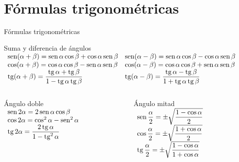 \documentclass[8pt]{beamer}
\title{}
\author{Ricardo Mateos}
\institute[UHEI-IVED]{Departamento de Matemáticas \\ UHEI - IVED}
\date{Matemáticas I}
\newcommand{\sen}{\mathop{\rm sen}\nolimits}
\newcommand{\tg}{\mathop{\rm tg}\nolimits}
\begin{document}
\begin{frame}
\maketitle
\end{frame}

\begin{frame}
\tableofcontents
\end{frame}

\section{Fórmulas trigonométricas}

\begin{frame}{Fórmulas trigonométricas}
\begin{alertblock}{Suma y diferencia de ángulos}
$\begin{array}{ll}
\sen(\alpha+\beta)=\sen\alpha\cos\beta+\cos\alpha\sen\beta & 
\sen(\alpha-\beta)=\sen\alpha\cos\beta-\cos\alpha\sen\beta \\
\cos(\alpha+\beta)=\cos\alpha\cos\beta-\sen\alpha\sen\beta & 
\cos(\alpha-\beta)=\cos\alpha\cos\beta+\sen\alpha\sen\beta \\
\tg(\alpha+\beta)=\dfrac{\tg\alpha+\tg\beta}{1-\tg\alpha\tg\beta} & 
\tg(\alpha-\beta)=\dfrac{\tg\alpha-\tg\beta}{1+\tg\alpha\tg\beta}
\end{array}$
\end{alertblock}

\begin{columns}
\begin{column}{0.45\textwidth}
\begin{alertblock}{Ángulo doble}
$\begin{array}{l}
\sen 2\alpha=2\sen\alpha\cos\beta  \\
\cos 2\alpha=\cos^2\alpha-\sen^2\alpha \\
\tg 2\alpha =\dfrac{2\tg\alpha}{1-\tg^2\alpha} 
\end{array}$
\vspace{2.3em}

\end{alertblock}
\end{column}
\begin{column}{0.45\textwidth}
\begin{alertblock}{Ángulo mitad}
$\begin{array}{l}
\sen \dfrac{\alpha}{2}=\pm \sqrt{\dfrac{1-\cos\alpha}{2}} \\
\cos \dfrac{\alpha}{2}=\pm \sqrt{\dfrac{1+\cos\alpha}{2}} \\
\tg \dfrac{\alpha}{2}=\pm \sqrt{\dfrac{1-\cos\alpha}{1+\cos\alpha}} 
\end{array}$
\end{alertblock}
\end{column}
\end{columns}
\end{frame}
\end{document}
